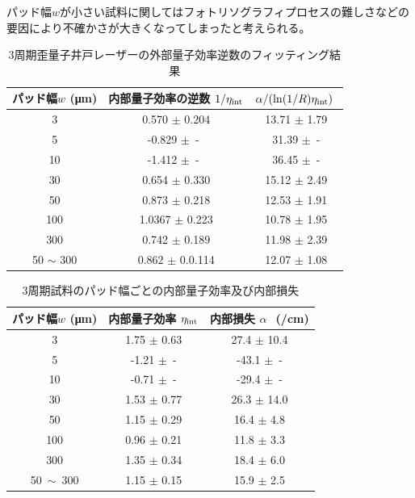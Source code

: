 {パッド幅$w$が小さい試料に関してはフォトリソグラフィプロセスの難しさなどの要因により不確かさが大きくなってしまったと考えられる。

\begin{table}[h]
  \caption{3周期歪量子井戸レーザーの外部量子効率逆数のフィッティング結果}
  \label{table:table_3QW_i_d_fit}
  \centering
  \begin{tabular}{ccc}
    \hline
    パッド幅$w$ (\si{\micro\metre})  &  内部量子効率の逆数 $1/\eta_{\rm{int}} $ & $\alpha/(\ln(1/R)\eta_{\rm{int}})\ $ \\
    \hline \hline
     3 & 0.570 $\pm$ 0.204  & 13.71 $\pm$ 1.79 \\
    5  & -0.829 $\pm$\ -\ & 31.39 $\pm$\ -\\
    10  & -1.412 $\pm$\ -\  & 36.45 $\pm$\ -\\ 
    30& 0.654 $\pm$ 0.330& 15.12 $\pm$ 2.49\\
    50& 0.873 $\pm$ 0.218&12.53 $\pm$ 1.91 \\
    100& 1.0367 $\pm$ 0.223& 10.78 $\pm$ 1.95\\
    300&0.742 $\pm$ 0.189 & 11.98 $\pm$ 2.39\\
    \hline
    50 $\sim$ 300 & 0.862 $\pm$ 0.0.114 & 12.07 $\pm$ 1.08\\
    \hline

  \end{tabular}
\end{table}


\begin{table}[h]
  \caption{3周期試料のパッド幅ごとの内部量子効率及び内部損失}
  \label{table:table_3QW_i_int}
  \centering
  \begin{tabular}{ccc}
    \hline
    パッド幅$w$ (\si{\micro\metre})  &  内部量子効率 $\eta_{\rm{int}} $ &内部損失 $\alpha\ $\ (/\si{cm}) \\
    \hline \hline
     3 & 1.75 $\pm$ 0.63 & 27.4 $\pm$ 10.4  \\
    5  & -1.21 $\pm$\ - & -43.1 $\pm$\ -\\
    10  & -0.71 $\pm$\ - & -29.4 $\pm$\ -\\ 
    30& 1.53 $\pm$ 0.77& 26.3 $\pm$ 14.0\\
    50& 1.15 $\pm$ 0.29&16.4 $\pm$ 4.8 \\
    100& 0.96 $\pm$ 0.21& 11.8 $\pm$ 3.3\\
    300&1.35 $\pm$ 0.34 & 18.4 $\pm$ 6.0\\
    \hline
    50\ $\sim$\ 300& 1.15 $\pm$ 0.15 & 15.9 $\pm$ 2.5\\
    \hline
  \end{tabular}
\end{table}


}

